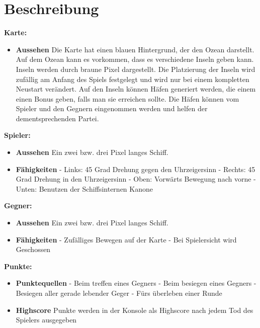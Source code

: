 \documentclass{article}
\begin{document}
\section{Beschreibung}
\textbf{Karte:}
\begin{itemize}
    \item \textbf{Aussehen}
        \newline
        Die Karte hat einen blauen Hintergrund, der den Ozean darstellt. Auf dem Ozean kann es vorkommen, dass es verschiedene Inseln geben kann. Inseln werden durch braune Pixel dargestellt. Die Platzierung der Inseln wird zufällig am Anfang des Spiels festgelegt und wird nur bei einem kompletten Neustart verändert. Auf den Inseln können Häfen generiert werden, die einem einen Bonus geben, falls man sie erreichen sollte. Die Häfen können vom Spieler und den Gegnern eingenommen werden und helfen der dementsprechenden Partei.
\end{itemize}
\textbf{Spieler:}
\begin{itemize}
    \item \textbf{Aussehen}
        \newline
        Ein zwei bzw. drei Pixel langes Schiff.
    \item \textbf{Fähigkeiten}
        \newline - Links: 45 Grad Drehung gegen den Uhrzeigersinn
        \newline - Rechts: 45 Grad Drehung in den Uhrzeigersinn
        \newline - Oben: Vorwärts Bewegung nach vorne
        \newline - Unten: Benutzen der Schiffsinternen Kanone
\end{itemize}
\textbf{Gegner:}
\begin{itemize}
    \item \textbf{Aussehen}
        \newline
        Ein zwei bzw. drei Pixel langes Schiff.
    \item \textbf{Fähigkeiten}
        \newline - Zufälliges Bewegen auf der Karte
        \newline - Bei Spielersicht wird Geschossen
\end{itemize}
\textbf{Punkte:}
\begin{itemize}
    \item \textbf{Punktequellen}
        \newline - Beim treffen eines Gegners
        \newline - Beim besiegen eines Gegners
        \newline - Besiegen aller gerade lebender Geger
        \newline - Fürs überleben einer Runde
    \item \textbf{Highscore}
        \newline
        Punkte werden in der Konsole als Highscore nach jedem Tod des Spielers ausgegeben
\end{itemize}
\newpage
\end{document}
